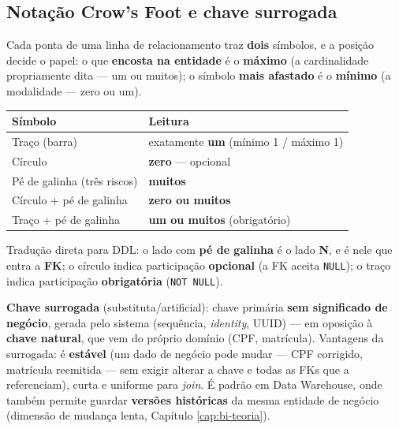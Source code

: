 \subsection{Notação Crow's Foot e chave surrogada}

\begin{conceito}
Cada ponta de uma linha de relacionamento traz \textbf{dois} símbolos, e a
posição decide o papel: o que \textbf{encosta na entidade} é o
\textbf{máximo} (a cardinalidade propriamente dita --- um ou muitos); o
símbolo \textbf{mais afastado} é o \textbf{mínimo} (a modalidade --- zero
ou um).

\begin{center}
\begin{tabular}{@{}p{4.6cm}p{7.4cm}@{}}
\toprule
\textbf{Símbolo} & \textbf{Leitura} \\
\midrule
Traço (barra) & exatamente \textbf{um} (mínimo 1 / máximo 1) \\
Círculo & \textbf{zero} --- opcional \\
Pé de galinha (três riscos) & \textbf{muitos} \\
Círculo + pé de galinha & \textbf{zero ou muitos} \\
Traço + pé de galinha & \textbf{um ou muitos} (obrigatório) \\
\bottomrule
\end{tabular}
\end{center}

Tradução direta para DDL: o lado com \textbf{pé de galinha} é o lado
\textbf{N}, e é nele que entra a \textbf{FK}; o círculo indica
participação \textbf{opcional} (a FK aceita \texttt{NULL}); o traço
indica participação \textbf{obrigatória} (\texttt{NOT NULL}).
\end{conceito}

\begin{conceito}
\textbf{Chave surrogada} (substituta/artificial): chave primária
\textbf{sem significado de negócio}, gerada pelo sistema (sequência,
\textit{identity}, UUID) --- em oposição à \textbf{chave natural}, que
vem do próprio domínio (CPF, matrícula). Vantagens da surrogada: é
\textbf{estável} (um dado de negócio pode mudar --- CPF corrigido,
matrícula reemitida --- sem exigir alterar a chave e todas as FKs que a
referenciam), curta e uniforme para \textit{join}. É padrão em Data
Warehouse, onde também permite guardar \textbf{versões históricas} da
mesma entidade de negócio (dimensão de mudança lenta, Capítulo
\ref{cap:bi-teoria}).
\end{conceito}

